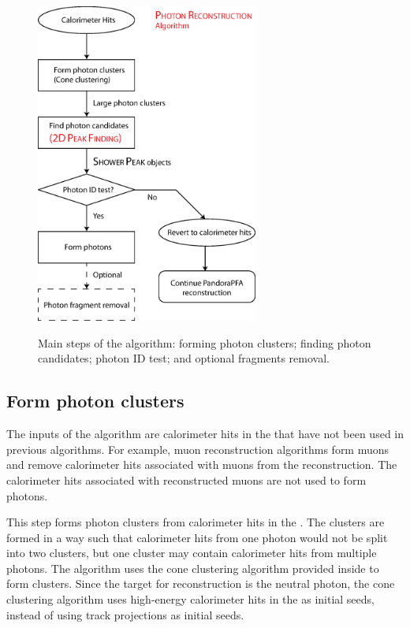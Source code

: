 \begin{figure}[tbph]
\centering
{\includegraphics[width=0.65\textwidth]{photon/photonRecoFlow2}}
\caption[A flow diagram of the \PhotonReconstruction algorithm.]
{Main steps of the \PhotonReconstruction algorithm: forming photon clusters; finding photon candidates; photon ID test; and optional fragments removal.}
\label{fig:photonPhotonRecoFlow}
\end{figure}


\subsection{Form photon clusters}

The inputs of the \PhotonReconstruction algorithm are calorimeter hits in the \ECAL that have not been used in previous algorithms. For example, muon reconstruction algorithms form muons and remove calorimeter hits associated with muons from the reconstruction. The  calorimeter hits associated with reconstructed muons are not used to form photons.

This step forms photon clusters from calorimeter hits in the \ECAL. The clusters are formed in a way such that calorimeter hits from one photon would not be split into two clusters, but one cluster may contain calorimeter hits from  multiple photons. The algorithm uses  the cone clustering algorithm  provided inside \pandora to form clusters.  Since the target for reconstruction is the neutral photon, the cone clustering algorithm uses high-energy calorimeter hits in the \ECAL as initial seeds, instead of using track projections as initial seeds.  %

